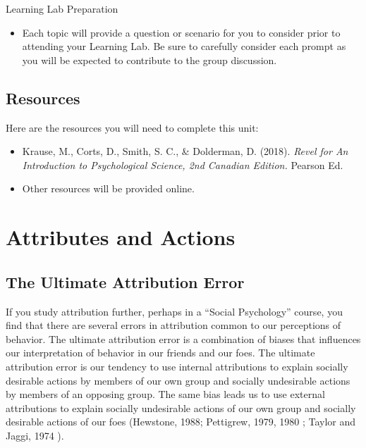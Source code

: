 \documentclass[
]{book}
\providecommand{\tightlist}{%
  \setlength{\itemsep}{0pt}\setlength{\parskip}{0pt}}
\begin{document}
\begin{reflect}
{Learning Lab Preparation}

\begin{itemize}
\tightlist
\item
  Each topic will provide a question or scenario for you to consider prior to attending your Learning Lab. Be sure to carefully consider each prompt as you will be expected to contribute to the group discussion.
\end{itemize}
\end{reflect}

\hypertarget{resources-6}{%
\subsection*{Resources}\label{resources-6}}

Here are the resources you will need to complete this unit:

\begin{itemize}
\tightlist
\item
  Krause, M., Corts, D., Smith, S. C., \& Dolderman, D. (2018). \emph{Revel for An Introduction to Psychological Science, 2nd Canadian Edition.} Pearson Ed.\\
\item
  Other resources will be provided online.
\end{itemize}

\hypertarget{attributes-and-actions}{%
\section{Attributes and Actions}\label{attributes-and-actions}}

\hypertarget{the-ultimate-attribution-error}{%
\subsection*{The Ultimate Attribution Error}\label{the-ultimate-attribution-error}}

If you study attribution further, perhaps in a ``Social Psychology'' course, you find that there are several errors in attribution common to our perceptions of behavior. The ultimate attribution error is a combination of biases that influences our interpretation of behavior in our friends and our foes. The ultimate attribution error is our tendency to use internal attributions to explain socially desirable actions by members of our own group and socially undesirable actions by members of an opposing group. The same bias leads us to use external attributions to explain socially undesirable actions of our own group and socially desirable actions of our foes (Hewstone, 1988; Pettigrew, 1979, 1980 ; Taylor and Jaggi, 1974 ).
\end{document}
